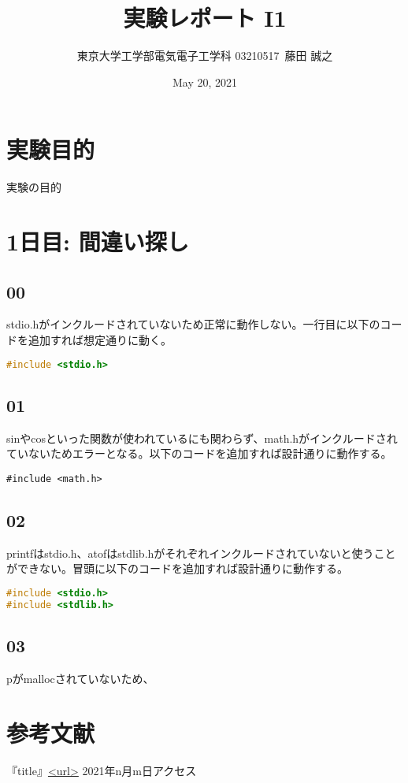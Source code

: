 \documentclass{ltjsarticle}
\title{実験レポート I1}
\author{東京大学工学部電気電子工学科 03210517\ 藤田 誠之 }
\date{ May 20, 2021}
\begin{document}
\maketitle
\section{実験目的}
実験の目的
\section{1日目: 間違い探し}
\subsection{00}
stdio.hがインクルードされていないため正常に動作しない。一行目に以下のコードを追加すれば想定通りに動く。
\begin{lstlisting}[caption=p00.c 追加部分,language=C]
#include <stdio.h>
\end{lstlisting}
\subsection{01}
sinやcosといった関数が使われているにも関わらず、math.hがインクルードされていないためエラーとなる。以下のコードを追加すれば設計通りに動作する。
\begin{lstlisting}[caption=p01.c 追加部分language=C]
#include <math.h>
\end{lstlisting}
\subsection{02}
printfはstdio.h、atofはstdlib.hがそれぞれインクルードされていないと使うことができない。冒頭に以下のコードを追加すれば設計通りに動作する。
\begin{lstlisting}[caption=p02.c 追加部分,language=C]
#include <stdio.h>
#include <stdlib.h>
\end{lstlisting}
\subsection{03}
pがmallocされていないため、

\section{参考文献}
『title』\url{<url>} 2021年n月m日アクセス
\end{document}
